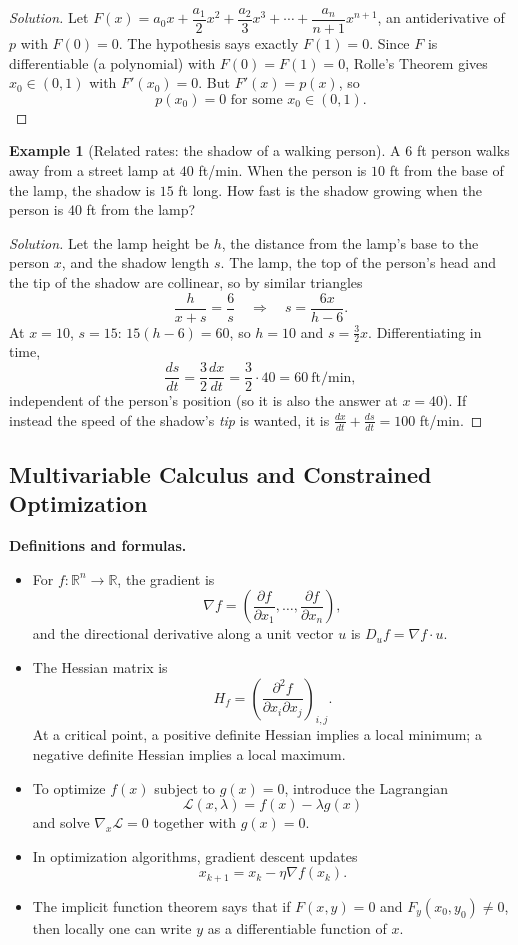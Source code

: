 \documentclass[11pt]{article}
\theoremstyle{definition}
\newtheorem{example}{Example}[section]
\newcommand{\R}{\mathbb{R}}
\begin{document}
\begin{proof}[Solution]
Let $F(x)=a_0x+\dfrac{a_1}2x^2+\dfrac{a_2}3x^3+\cdots+\dfrac{a_n}{n+1}x^{n+1}$, an antiderivative of $p$ with $F(0)=0$. The hypothesis says exactly $F(1)=0$. Since $F$ is differentiable (a polynomial) with $F(0)=F(1)=0$, Rolle's Theorem gives $x_0\in(0,1)$ with $F'(x_0)=0$. But $F'(x)=p(x)$, so
\[
\boxed{p(x_0)=0 \text{ for some } x_0\in(0,1)}.
\]
\end{proof}

\begin{example}[Related rates: the shadow of a walking person]
A $6$ ft person walks away from a street lamp at $40$ ft/min. When the person is $10$ ft from the base of the lamp, the shadow is $15$ ft long. How fast is the shadow growing when the person is $40$ ft from the lamp?
\end{example}

\begin{proof}[Solution]
Let the lamp height be $h$, the distance from the lamp's base to the person $x$, and the shadow length $s$. The lamp, the top of the person's head and the tip of the shadow are collinear, so by similar triangles
\[
\frac h{x+s}=\frac6s\quad\Longrightarrow\quad s=\frac{6x}{h-6}.
\]
At $x=10$, $s=15$: $15(h-6)=60$, so $h=10$ and $s=\tfrac{3}{2}x$. Differentiating in time,
\[
\frac{ds}{dt}=\frac32\frac{dx}{dt}=\frac32\cdot40=\boxed{60\ \text{ft/min}},
\]
independent of the person's position (so it is also the answer at $x=40$). If instead the speed of the shadow's \emph{tip} is wanted, it is $\tfrac{dx}{dt}+\tfrac{ds}{dt}=100$ ft/min.
\end{proof}

\subsection{Multivariable Calculus and Constrained Optimization}
\textbf{Definitions and formulas.}
\begin{itemize}
    \item For $f:\R^n\to\R$, the gradient is
    \[
        \nabla f = \left(\frac{\partial f}{\partial x_1},\dots,\frac{\partial f}{\partial x_n}\right),
    \]
    and the directional derivative along a unit vector $u$ is $D_u f = \nabla f \cdot u$.
    \item The Hessian matrix is
    \[
        H_f = \left(\frac{\partial^2 f}{\partial x_i\partial x_j}\right)_{i,j}.
    \]
    At a critical point, a positive definite Hessian implies a local minimum; a negative definite Hessian implies a local maximum.
    \item To optimize $f(x)$ subject to $g(x)=0$, introduce the Lagrangian
    \[
        \mathcal{L}(x,\lambda)=f(x)-\lambda g(x)
    \]
    and solve $\nabla_x\mathcal{L}=0$ together with $g(x)=0$.
    \item In optimization algorithms, gradient descent updates
    \[
        x_{k+1}=x_k-\eta \nabla f(x_k).
    \]
    \item The implicit function theorem says that if $F(x,y)=0$ and $F_y(x_0,y_0)\neq 0$, then locally one can write $y$ as a differentiable function of $x$.
\end{itemize}
\end{document}
